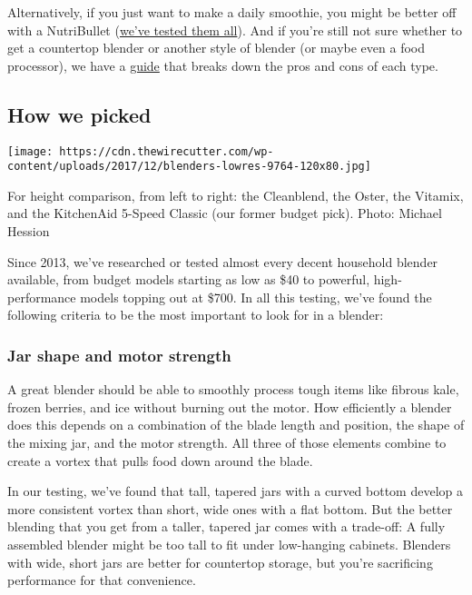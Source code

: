 Alternatively, if you just want to make a daily smoothie, you might be
better off with a NutriBullet
(\href{https://www.nytimes3xbfgragh.onion/wirecutter/reviews/nutribullet/}{we've
tested them all}). And if you're still not sure whether to get a
countertop blender or another style of blender (or maybe even a food
processor), we have a
\href{https://www.nytimes3xbfgragh.onion/wirecutter/reviews/blender-food-processor-mixer/}{guide}
that breaks down the pros and cons of each type.

\hypertarget{how-we-picked}{%
\subsection{How we picked}\label{how-we-picked}}

\texttt{[image: https://cdn.thewirecutter.com/wp-content/uploads/2017/12/blenders-lowres-9764-120x80.jpg]}

For height comparison, from left to right: the Cleanblend, the Oster,
the Vitamix, and the KitchenAid 5-Speed Classic (our former budget
pick). Photo: Michael Hession

Since 2013, we've researched or tested almost every decent household
blender available, from budget models starting as low as \$40 to
powerful, high-performance models topping out at \$700. In all this
testing, we've found the following criteria to be the most important to
look for in a blender:

\hypertarget{jar-shape-and-motor-strength}{%
\subsubsection{Jar shape and motor
strength}\label{jar-shape-and-motor-strength}}

A great blender should be able to smoothly process tough items like
fibrous kale, frozen berries, and ice without burning out the motor. How
efficiently a blender does this depends on a combination of the blade
length and position, the shape of the mixing jar, and the motor
strength. All three of those elements combine to create a vortex that
pulls food down around the blade.

In our testing, we've found that tall, tapered jars with a curved bottom
develop a more consistent vortex than short, wide ones with a flat
bottom. But the better blending that you get from a taller, tapered jar
comes with a trade-off: A fully assembled blender might be too tall to
fit under low-hanging cabinets. Blenders with wide, short jars are
better for countertop storage, but you're sacrificing performance for
that convenience.

